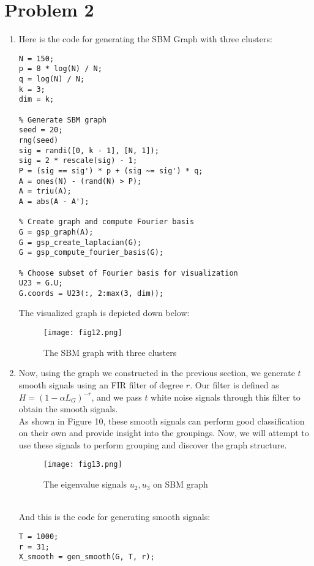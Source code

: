 \documentclass{article}
\begin{document}
\section*{Problem 2}
\begin{enumerate}
    \item 

    Here is the code for generating the SBM Graph with three clusters:
\begin{lstlisting}
N = 150;
p = 8 * log(N) / N;
q = log(N) / N;
k = 3;
dim = k;

% Generate SBM graph
seed = 20;
rng(seed)
sig = randi([0, k - 1], [N, 1]);
sig = 2 * rescale(sig) - 1;
P = (sig == sig') * p + (sig ~= sig') * q;
A = ones(N) - (rand(N) > P);
A = triu(A);
A = abs(A - A');

% Create graph and compute Fourier basis
G = gsp_graph(A);
G = gsp_create_laplacian(G);
G = gsp_compute_fourier_basis(G);

% Choose subset of Fourier basis for visualization
U23 = G.U;
G.coords = U23(:, 2:max(3, dim));
\end{lstlisting}

    The visualized graph is depicted down below:
    \begin{figure}[h!]
        \centering
        \texttt{[image: fig12.png]} 
        \caption{The SBM graph with three clusters}
        \label{fig:gr8}
    \end{figure}


    \newpage
    \item

    Now, using the graph we constructed in the previous section, we generate \( t \) smooth signals using an FIR filter of degree \( r \). Our filter is defined as \( H = (1 -\alpha L_G )^{-r} \), and we pass \( t \) white noise signals through this filter to obtain the smooth signals.
    \\
    As shown in Figure 10, these smooth signals can perform good classification on their own and provide insight into the groupings. Now, we will attempt to use these signals to perform grouping and discover the graph structure.
    \\
    
    \begin{figure}[h!]
        \centering
        \texttt{[image: fig13.png]} 
        \caption{The eigenvalue signals $u_2, u_3$ on SBM graph}
        \label{fig:gr8}
    \end{figure}
    \\
    And this is the code for generating smooth signals:
\begin{lstlisting}
T = 1000;
r = 31;
X_smooth = gen_smooth(G, T, r);


\end{lstlisting}
\end{enumerate}
\end{document}
